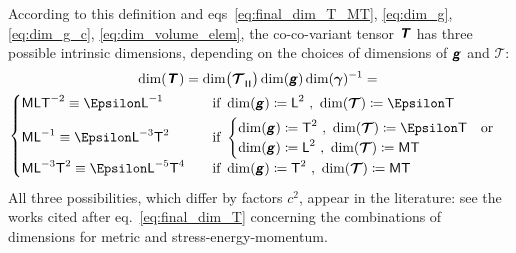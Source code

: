 \documentclass[\ifafour a4paper,12pt,\else a5paper,10pt,\fi%
onecolumn,oneside,article,%
british%
]{memoir}
\makeatletter
\theoremstyle{remark}
\theoremstyle{innote}
\newcommand*{\mathte}[1]{\textbf{\textit{\textsf{#1}}}}
\newcommand*{\defd}{\coloneqq}
\renewcommand*{\|}[1][]{\nonscript\,#1\vert\nonscript\;\mathopen{}}
\newcommand*{\sect}{\S}%
\newcommand*{\eqn}{eq.}%
\newcommand*{\eqns}{eqs}%
\newcommand*{\q}{}%
\DeclareRobustCommand*{\q}{%
  \mathord{\mathpalette\bigcdot@{}}%
}
\newcommand*{\bigcdot@scalefactor}{0.7}
\newcommand*{\bigcdot@widthfactor}{1.5}
\newcommand*{\bigcdot@}[2]{%
  \sbox0{$#1\vcenter{}$}%
  \sbox2{$#1\cdot\m@th$}%
  \hbox to \bigcdot@widthfactor\wd2{%
    \hfil
    \raise\ht0\hbox{%
      \scalebox{\bigcdot@scalefactor}{%
        \lower\ht0\hbox{$#1\bullet\m@th$}%
      }%
    }%
    \hfil
  }%
}
\newcommand*{\Le}{\textsf{L}}
\newcommand*{\Ti}{\textsf{T}}
\newcommand*{\Ma}{\textsf{M}}
\newcommand*{\En}{\Epsilon}%
\newcommand*{\yg}{\mathte{g}}
\newcommand*{\yT}{\bm{\mathcal{T}}}
\newcommand*{\yTe}{\mathte{T}}
\renewcommand*{\i}{\indices}
\newcommand*{\ygv}{\bm{\gamma}}
\newcommand*{\rul}{{\mkern2mu\rule[-0.1ex]{0.75pt}{1.1ex}\mkern2mu}}
\DeclarePairedDelimiter\mul{\rul}{\rul}%
\makeatother
\begin{document}
According to this definition and \eqns~\eqref{eq:final_dim_T_MT},
\eqref{eq:dim_g}, \eqref{eq:dim_g_c}, \eqref{eq:dim_volume_elem}, the
co-co-variant tensor $\yTe$ has three possible intrinsic dimensions,
depending on the choices of dimensions of $\yg$ and $\yT$:
\begin{multline}
\label{eq:dim_co_co_T}
\dim(\yTe\i{_{\q\q}}) =
\dim\bigl(\yT\i{_{\q \mul{\q\q\q}}}\bigr) \dim(\yg) \dim(\ygv)^{-1}
  ={}\\
  \begin{cases}
    \Ma\Le\Ti^{-2} \equiv \En\Le^{-1} & \quad\text{if}\ 
\dim(\yg)\defd \Le^2 \ ,\ \dim(\yT)\defd \En\Ti
    \\[\jot]
\Ma\Le^{-1} \equiv \En\Le^{-3}\Ti^{2} & \quad\text{if}\ 
 \begin{cases}
\dim(\yg)\defd \Ti^2 \ ,\ \dim(\yT)\defd \En\Ti 
    \quad\text{or}\\
\dim(\yg)\defd \Le^2 \ ,\ \dim(\yT)\defd \Ma\Ti 
 \end{cases}
   \\[2\jot]
    \Ma\Le^{-3}\Ti^{2} \equiv \En\Le^{-5}\Ti^{4} & \quad\text{if}\ 
\dim(\yg)\defd \Ti^2 \ ,\ \dim(\yT)\defd \Ma\Ti
  \end{cases}
\end{multline}
All three possibilities, which differ by factors $c^{2}$, appear in the
literature: see the works cited after \eqn~\eqref{eq:final_dim_T}
concerning the combinations of dimensions for metric and
stress-energy-momentum.

 


\end{document}
